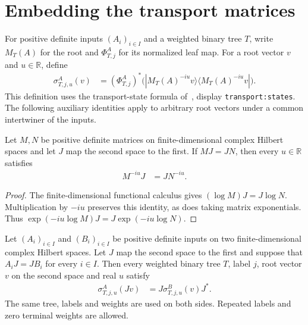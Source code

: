 \section{Embedding the transport matrices}
\label{sec:transport_state_intertwine}

For positive definite inputs $(A_i)_{i\in I}$ and a weighted binary tree $T$,
write $M_T(A)$ for the root and $\Phi_{T,j}^A$ for its normalized leaf map.
For a root vector $v$ and $u\in\mathbb R$, define
\begin{align}
  \sigma_{T,j,u}^A(v)
    &=(\Phi_{T,j}^A)^*
       \bigl(|M_T(A)^{-iu}v\rangle\langle M_T(A)^{-iu}v|\bigr).
\end{align}
This definition uses the transport-state formula of~\cite{OpenAI2026AreaLaw},
display \texttt{transport:states}. The following auxiliary identities apply
to arbitrary root vectors under a common intertwiner of the inputs.

\begin{lemma}
  \label{lem:imaginary_power_intertwine}
  \leanok
  Let $M,N$ be positive definite matrices on finite-dimensional complex
  Hilbert spaces and let $J$ map the second space to the first.
  If $MJ=JN$, then every $u\in\mathbb R$ satisfies
  \begin{align}
    M^{-iu}J&=JN^{-iu}.
  \end{align}
\end{lemma}

\begin{proof}
  \leanok
  The finite-dimensional functional calculus gives $(\log M)J=J\log N$.
  Multiplication by $-iu$ preserves this identity, as does taking matrix
  exponentials. Thus $\exp(-iu\log M)J=J\exp(-iu\log N)$.
\end{proof}

\begin{theorem}
  \label{thm:transport_state_intertwine}
  \leanok
  Let $(A_i)_{i\in I}$ and $(B_i)_{i\in I}$ be positive definite inputs
  on two finite-dimensional complex Hilbert spaces.
  Let $J$ map the second space to the first and suppose that
  $A_iJ=JB_i$ for every $i\in I$.
  Then every weighted binary tree $T$, label $j$, root vector $v$ on the
  second space and real $u$ satisfy
  \begin{align}
    \sigma_{T,j,u}^A(Jv)&=J\sigma_{T,j,u}^B(v)J^*.
  \end{align}
  The same tree, labels and weights are used on both sides. Repeated labels
  and zero terminal weights are allowed.
\end{theorem}

